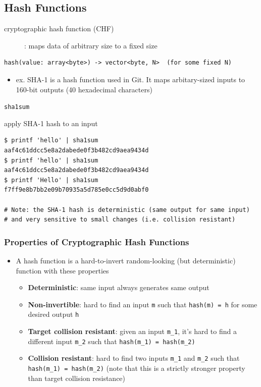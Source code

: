 \documentclass[letterpaper,12pt]{article}
\newcommand*{\lstitem}[1]{
  \setbox0\hbox{\lstinline{#1}}
  \item[\usebox0]
}
\begin{document}
\subsection{Hash Functions}
\begin{description}
 \item[cryptographic hash function (CHF)]: maps data of arbitrary size to a fixed size
\end{description}

\begin{lstlisting}
hash(value: array<byte>) -> vector<byte, N>  (for some fixed N)
\end{lstlisting}


\begin{itemize}
 \item ex. SHA-1 is a hash function used in Git. It maps arbitary-sized inputs to 160-bit outputs (40 hexadecimal characters)
\end{itemize}

\begin{description}
 \lstitem{sha1sum} apply SHA-1 hash to an input
\end{description}

\begin{lstlisting}
$ printf 'hello' | sha1sum
aaf4c61ddcc5e8a2dabede0f3b482cd9aea9434d
$ printf 'hello' | sha1sum
aaf4c61ddcc5e8a2dabede0f3b482cd9aea9434d
$ printf 'Hello' | sha1sum
f7ff9e8b7bb2e09b70935a5d785e0cc5d9d0abf0

# Note: the SHA-1 hash is deterministic (same output for same input)
# and very sensitive to small changes (i.e. collision resistant)
\end{lstlisting}

\subsubsection{Properties of Cryptographic Hash Functions}
\begin{itemize}
 \item A hash function is a hard-to-invert random-looking (but deterministic) function with these properties
       \begin{itemize}
        \item \textbf{Deterministic}: same input always generates same output
        \item \textbf{Non-invertible}: hard to find an input \lstinline{m} such that \lstinline{hash(m) = h} for some desired output \lstinline{h}
        \item \textbf{Target collision resistant}: given an input \lstinline{m_1}, it’s hard to find a different input \lstinline{m_2} such that \lstinline{hash(m_1) = hash(m_2)}
        \item \textbf{Collision resistant}: hard to find two inputs \lstinline{m_1} and \lstinline{m_2} such that \lstinline{hash(m_1) = hash(m_2)} (note that this is a strictly stronger property than target collision resistance)
       \end{itemize}
\end{itemize}
\end{document}
